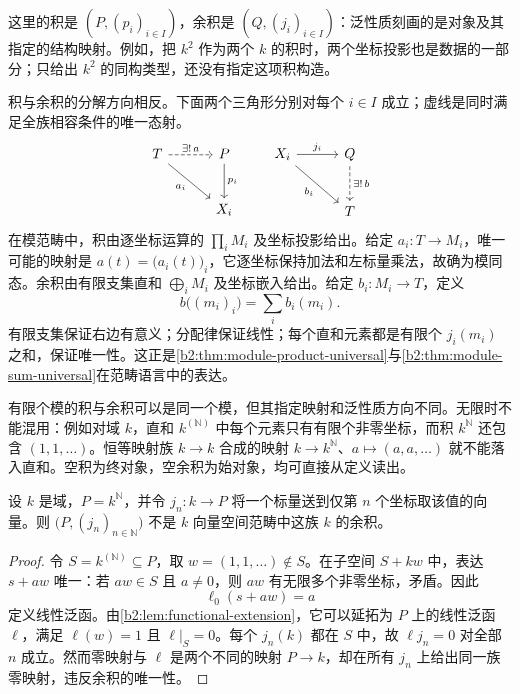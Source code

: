这里的积是 \((P,(p_i)_{i\in I})\)，余积是 \((Q,(j_i)_{i\in I})\)：泛性质刻画的是对象及其指定的结构映射。例如，把 \(k^2\) 作为两个 \(k\) 的积时，两个坐标投影也是数据的一部分；只给出 \(k^2\) 的同构类型，还没有指定这项积构造。

\ProseParagraphBreak
积与余积的分解方向相反。下面两个三角形分别对每个 \(i\in I\) 成立；虚线是同时满足全族相容条件的唯一态射。
\[
	\begin{tikzcd}[column sep=3em,row sep=2.5em]
		T\arrow[r,dashed,"\exists!\,a"]\arrow[dr,"a_i"']&P\arrow[d,"p_i"]\\
		&X_i
	\end{tikzcd}
	\qquad
	\begin{tikzcd}[column sep=3em,row sep=2.5em]
		X_i\arrow[r,"j_i"]\arrow[dr,"b_i"']&Q\arrow[d,dashed,"\exists!\,b"]\\
		&T
	\end{tikzcd}
\]
在模范畴中，积由逐坐标运算的 \(\prod_i M_i\) 及坐标投影给出。给定 \(a_i:T\rightarrow M_i\)，唯一可能的映射是 \(a(t)=\bigl(a_i(t)\bigr)_i\)，它逐坐标保持加法和左标量乘法，故确为模同态。余积由有限支集直和 \(\bigoplus_iM_i\) 及坐标嵌入给出。给定 \(b_i:M_i\rightarrow T\)，定义
\[
	b\bigl((m_i)_i\bigr)=\sum_i b_i(m_i).
\]
有限支集保证右边有意义；分配律保证线性；每个直和元素都是有限个 \(j_i(m_i)\) 之和，保证唯一性。这正是\cref{b2:thm:module-product-universal}与\cref{b2:thm:module-sum-universal}在范畴语言中的表达。

\ProseParagraphBreak
有限个模的积与余积可以是同一个模，但其指定映射和泛性质方向不同。无限时不能混用：例如对域 \(k\)，直和 \(k^{(\mathbb N)}\) 中每个元素只有有限个非零坐标，而积 \(k^{\mathbb N}\) 还包含 \((1,1,\ldots)\)。恒等映射族 \(k\rightarrow k\) 合成的映射 \(k\rightarrow k^{\mathbb N}\)、\(a\mapsto(a,a,\ldots)\) 就不能落入直和。空积为终对象，空余积为始对象，均可直接从定义读出。

\begin{proposition}\label{b2:prop:infinite-product-not-coproduct}
	设 \(k\) 是域，\(P=k^{\mathbb N}\)，并令 \(j_n:k\to P\) 将一个标量送到仅第 \(n\) 个坐标取该值的向量。则 \(\bigl(P,(j_n)_{n\in\mathbb N}\bigr)\) 不是 \(k\) 向量空间范畴中这族 \(k\) 的余积。
\end{proposition}
\begin{proof}
	令 \(S=k^{(\mathbb N)}\subseteq P\)，取 \(w=(1,1,\ldots)\notin S\)。在子空间 \(S+kw\) 中，表达 \(s+aw\) 唯一：若 \(aw\in S\) 且 \(a\ne0\)，则 \(aw\) 有无限多个非零坐标，矛盾。因此
	\[
		\ell_0(s+aw)=a
	\]
	定义线性泛函。由\cref{b2:lem:functional-extension}，它可以延拓为 \(P\) 上的线性泛函 \(\ell\)，满足 \(\ell(w)=1\) 且 \(\ell|_S=0\)。每个 \(j_n(k)\) 都在 \(S\) 中，故 \(\ell j_n=0\) 对全部 \(n\) 成立。然而零映射与 \(\ell\) 是两个不同的映射 \(P\to k\)，却在所有 \(j_n\) 上给出同一族零映射，违反余积的唯一性。
\end{proof}

